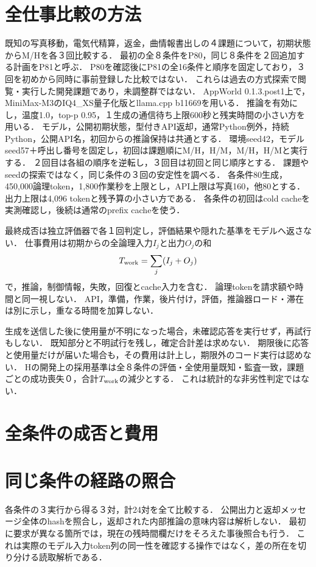 \documentclass[uplatex,a4paper,twocolumn,10pt]{jsarticle}
\begin{document}
\section{全仕事比較の方法}
既知の写真移動，電気代精算，返金，曲情報書出しの４課題について，初期状態からM/Hを各３回比較する．
最初の全８条件をP80，同じ８条件を２回追加する計画をP81と呼ぶ．
P80を確認後にP81の全16条件と順序を固定しており，３回を初めから同時に事前登録した比較ではない．
これらは過去の方式探索で閲覧・実行した開発課題であり，未調整群ではない．
AppWorld 0.1.3.post1上で，MiniMax-M3のIQ4\_XS量子化版とllama.cpp b11669を用いる．
推論を有効にし，温度1.0，top-p 0.95，１生成の通信待ち上限600秒と残実時間の小さい方を用いる．
モデル，公開初期状態，型付きAPI返却，通常Python例外，持続Python，公開API名，初回からの推論保持は共通とする．
環境seed42，モデルseed57＋呼出し番号を固定し，初回は課題順にM/H，H/M，M/H，H/Mと実行する．
２回目は各組の順序を逆転し，３回目は初回と同じ順序とする．
課題やseedの探索ではなく，同じ条件の３回の安定性を調べる．
各条件80生成，450,000論理token，1,800作業秒を上限とし，API上限は写真160，他80とする．
出力上限は4,096 tokenと残予算の小さい方である．
各条件の初回はcold cacheを実測確認し，後続は通常のprefix cacheを使う．

最終成否は独立評価器で各１回判定し，評価結果や隠れた基準をモデルへ返さない．
仕事費用は初期からの全論理入力$I_j$と出力$O_j$の和
\begin{equation}T_{\rm work}=\sum_j(I_j+O_j)\end{equation}
で，推論，制御情報，失敗，回復とcache入力を含む．
論理tokenを請求額や時間と同一視しない．
API，準備，作業，後片付け，評価，推論器ロード・滞在は別に示し，重なる時間を加算しない．

生成を送信した後に使用量が不明になった場合，未確認応答を実行せず，再試行もしない．
既知部分と不明試行を残し，確定合計差は求めない．
期限後に応答と使用量だけが届いた場合も，その費用は計上し，期限外のコード実行は認めない．
Hの開発上の採用基準は全８条件の評価・全使用量既知・監査一致，課題ごとの成功喪失０，合計$T_{\rm work}$の減少とする．
これは統計的な非劣性判定ではない．

\section{全条件の成否と費用}


\section{同じ条件の経路の照合}
各条件の３実行から得る３対，計24対を全て比較する．
公開出力と返却メッセージ全体のhashを照合し，返却された内部推論の意味内容は解析しない．
最初に要求が異なる箇所では，現在の残時間欄だけをそろえた事後照合も行う．
これは実際のモデル入力token列の同一性を確認する操作ではなく，差の所在を切り分ける読取解析である．

\end{document}
